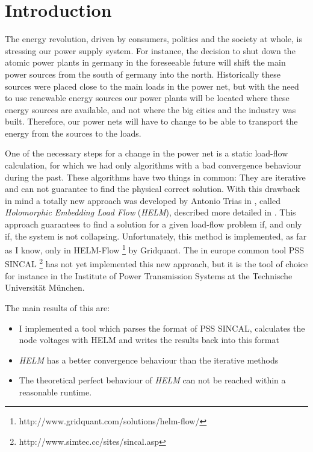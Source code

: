 \chapter{Introduction}
The energy revolution, driven by consumers, politics and the society at whole, is stressing our power supply system. For instance, the decision to shut down the atomic power plants in germany in the foreseeable future will shift the main power sources from the south of germany into the north. Historically these sources were placed close to the main loads in the power net, but with the need to use renewable energy sources our power plants will be located where these energy sources are available, and not where the big cities and the industry was built. Therefore, our power nets will have to change to be able to transport the energy from the sources to the loads.

One of the necessary steps for a change in the power net is a static load-flow calculation, for which we had only algorithms with a bad convergence behaviour during the past. These algorithms have two things in common: They are iterative and can not guarantee to find the physical correct solution. With this drawback in mind a totally new approach was developed by Antonio Trias in \citep{helmIEEE}, called \emph{Holomorphic Embedding Load Flow} (\emph{HELM}), described more detailed in . This approach guarantees to find a solution for a given load-flow problem if, and only if, the system is not collapsing. Unfortunately, this method is implemented, as far as I know, only in HELM-Flow \footnote{http://www.gridquant.com/solutions/helm-flow/} by Gridquant. The in europe common tool PSS SINCAL \footnote{http://www.simtec.cc/sites/sincal.asp} has not yet implemented this new approach, but it is the tool of choice for instance in the Institute of Power Transmission Systems at the Technische Universität München. 

The main results of this are:
\begin{itemize}
	\item I implemented a tool which parses the format of PSS SINCAL, calculates the node voltages with HELM and writes the results back into this format
	\item \emph{HELM} has a better convergence behaviour than the iterative methods
	\item The theoretical perfect behaviour of \emph{HELM} can not be reached within a reasonable runtime.
\end{itemize}